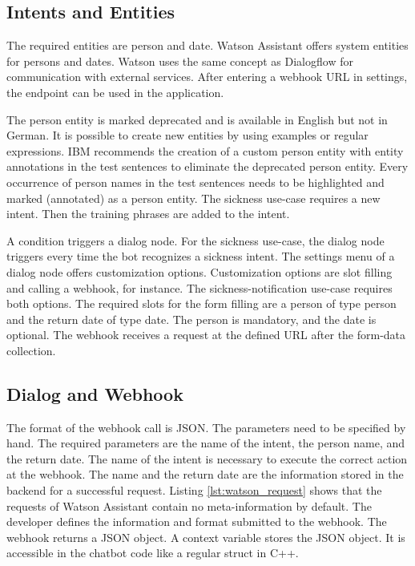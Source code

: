 \subsection{Intents and Entities}
The required entities are person and date.
Watson Assistant offers system entities for persons and dates.
Watson uses the same concept as Dialogflow for communication with external services.
After entering a webhook URL in settings, the endpoint can be used in the application.

The person entity is marked deprecated and is available in English but not in German.
It is possible to create new entities by using examples or regular expressions.
IBM recommends the creation of a custom person entity with entity annotations in the test sentences to eliminate the deprecated person entity.
Every occurrence of person names in the test sentences needs to be highlighted and marked (annotated) as a person entity.
The sickness use-case requires a new intent. 
Then the training phrases are added to the intent.

A condition triggers a dialog node.
For the sickness use-case, the dialog node triggers every time the bot recognizes a sickness intent.
The settings menu of a dialog node offers customization options.
Customization options are slot filling and calling a webhook, for instance.
The sickness-notification use-case requires both options.
The required slots for the form filling are a person of type person and the return date of type date.
The person is mandatory, and the date is optional.
The webhook receives a request at the defined URL after the form-data collection.

\subsection{Dialog and Webhook}
The format of the webhook call is JSON.
The parameters need to be specified by hand.
The required parameters are the name of the intent, the person name, and the return date.
The name of the intent is necessary to execute the correct action at the webhook.
The name and the return date are the information stored in the backend for a successful request.
Listing \ref{lst:watson_request} shows that the requests of Watson Assistant contain no meta-information by default.
The developer defines the information and format submitted to the webhook.
The webhook returns a JSON object.
A context variable stores the JSON object.
It is accessible in the chatbot code like a regular struct in C++.

